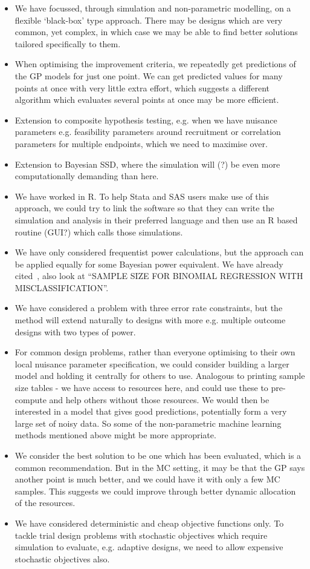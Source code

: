 \documentclass{article} %
\begin{document}
\begin{itemize}
\item We have focussed, through simulation and non-parametric modelling, on a flexible `black-box' type approach. There may be designs which are very common, yet complex, in which case we may be able to find better solutions tailored specifically to them. 
\item When optimising the improvement criteria, we repeatedly get predictions of the GP models for just one point. We can get predicted values for many points at once with very little extra effort, which suggests a different algorithm which evaluates several points at once may be more efficient.

\item Extension to composite hypothesis testing, e.g. when we have nuisance parameters e.g. feasibility parameters around recruitment or correlation parameters for multiple endpoints, which we need to maximise over.
\item Extension to Bayesian SSD, where the simulation will (?) be even more computationally demanding than here.
\item We have worked in R. To help Stata and SAS users make use of this approach, we could try to link the software so that they can write the simulation and analysis in their preferred language and then use an R based routine (GUI?) which calls those simulations.
\item We have only considered frequentist power calculations, but the approach can be applied equally for some Bayesian power equivalent. We have already cited~\cite{Wang2002}, also look at ``SAMPLE SIZE FOR BINOMIAL REGRESSION WITH MISCLASSIFICATION''.
\item We have considered a problem with three error rate constraints, but the method will extend naturally to designs with more e.g. multiple outcome designs with two types of power.
\item For common design problems, rather than everyone optimising to their own local nuisance parameter specification, we could consider building a larger model and holding it centrally for others to use. Analogous to printing sample size tables - we have access to resources here, and could use these to pre-compute and help others without those resources. We would then be interested in a model that gives good predictions, potentially form a very large set of noisy data. So some of the non-parametric machine learning methods mentioned above might be more appropriate.
\item We consider the best solution to be one which has been evaluated, which is a common recommendation. But in the MC setting, it may be that the GP says another point is much better, and we could have it with only a few MC samples. This suggests we could improve through better dynamic allocation of the resources.
\item We have considered deterministic and cheap objective functions only. To tackle trial design problems with stochastic objectives which require simulation to evaluate, e.g. adaptive designs, we need to allow expensive stochastic objectives also.

\end{itemize}



\end{document}
